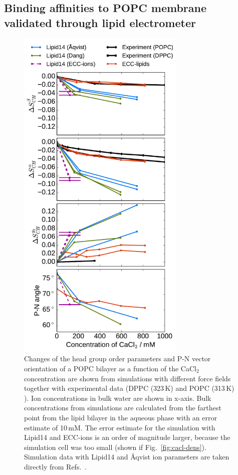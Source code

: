 \documentclass[aip,jcp,twocolumn]{revtex4}
\begin{document}
\subsection{Binding affinities to POPC membrane validated through lipid electrometer}

\begin{figure}[htb!]
  \centering
  \includegraphics[width=8.0cm]{../Fig/ipython_nb/PN_angle_OrdPars-A-B-g3_L14-ECCL17_q80_sig89_CaCl.pdf}
  \caption{\label{fig:delta_ordPar_CaCl}
    Changes of the head group order parameters and P-N vector orientation of a POPC bilayer 
    as a function of the CaCl$_2$ concentration
    are shown from simulations with different force fields together with experimental data 
    (DPPC (323\,K) \cite{akutsu81} and POPC (313\,K) \cite{altenbach84}). 
    Ion concentrations in bulk water are shown in x-axis. 
    Bulk concentrations from simulations are calculated 
    from the farthest point from the lipid bilayer in the aqueous phase
    with an error estimate of 10\,mM.
    The error estimate for the simulation with Lipid14 and ECC-ions is an order of magnitude larger, 
    because the simulation cell was too small (shown if Fig.~\ref{fig:cacl-dens}). 
    Simulation data with Lipid14 and \AA{}qvist ion parameters are taken directly from
    Refs.~\cite{lipid14POPC0mMNaClfiles,lipid14POPC350mMCaClfiles,lipid14POPC350mMCaClfilesNC}.
  }
\end{figure}
\end{document}

